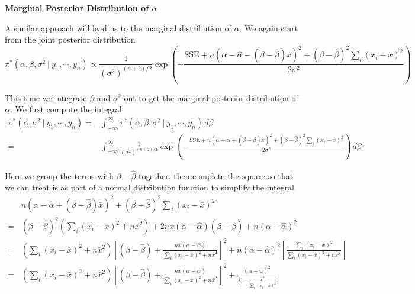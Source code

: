 \documentclass[]{book}
\theoremstyle{definition}
\theoremstyle{definition}
\theoremstyle{definition}
\theoremstyle{remark}
\begin{document}
\textbf{Marginal Posterior Distribution of \(\alpha\)}

A similar approach will lead us to the marginal distribution of
\(\alpha\). We again start from the joint posterior distribution
\[ \pi^*(\alpha, \beta, \sigma^2~|~y_1,\cdots,y_n) \propto \frac{1}{(\sigma^2)^{(n+2)/2}}\exp\left(-\frac{\text{SSE} + n(\alpha-\hat{\alpha}-(\beta-\hat{\beta})\bar{x})^2 + (\beta - \hat{\beta})^2\sum_i (x_i-\bar{x})^2}{2\sigma^2}\right) \]

This time we integrate \(\beta\) and \(\sigma^2\) out to get the
marginal posterior distribution of \(\alpha\). We first compute the
integral \[
\begin{aligned}
\pi^*(\alpha, \sigma^2~|~y_1,\cdots, y_n) = & \int_{-\infty}^\infty \pi^*(\alpha, \beta, \sigma^2~|~y_1,\cdots, y_n)\, d\beta\\
= & \int_{-\infty}^\infty \frac{1}{(\sigma^2)^{(n+2)/2}}\exp\left(-\frac{\text{SSE} + n(\alpha-\hat{\alpha}+(\beta-\hat{\beta})\bar{x})^2 + (\beta - \hat{\beta})^2\sum_i (x_i-\bar{x})^2}{2\sigma^2}\right)\, d\beta 
\end{aligned}
\]

Here we group the terms with \(\beta-\hat{\beta}\) together, then
complete the square so that we can treat is as part of a normal
distribution function to simplify the integral \[
\begin{aligned}
& n(\alpha-\hat{\alpha}+(\beta-\hat{\beta})\bar{x})^2+(\beta-\hat{\beta})^2\sum_i(x_i-\bar{x})^2 \\
= & (\beta-\hat{\beta})^2\left(\sum_i (x_i-\bar{x})^2 + n\bar{x}^2\right) + 2n\bar{x}(\alpha-\hat{\alpha})(\beta-\hat{\beta}) + n(\alpha-\hat{\alpha})^2 \\
= & \left(\sum_i (x_i-\bar{x})^2 + n\bar{x}^2\right)\left[(\beta-\hat{\beta})+\frac{n\bar{x}(\alpha-\hat{\alpha})}{\sum_i(x_i-\bar{x})^2+n\bar{x}^2}\right]^2+ n(\alpha-\hat{\alpha})^2\left[\frac{\sum_i(x_i-\bar{x})^2}{\sum_i (x_i-\bar{x})^2+n\bar{x}^2}\right]\\
= & \left(\sum_i (x_i-\bar{x})^2 + n\bar{x}^2\right)\left[(\beta-\hat{\beta})+\frac{n\bar{x}(\alpha-\hat{\alpha})}{\sum_i(x_i-\bar{x})^2+n\bar{x}^2}\right]^2+\frac{(\alpha-\hat{\alpha})^2}{\frac{1}{n}+\frac{\bar{x}^2}{\sum_i (x_i-\bar{x})^2}}
\end{aligned}
\]
\end{document}

